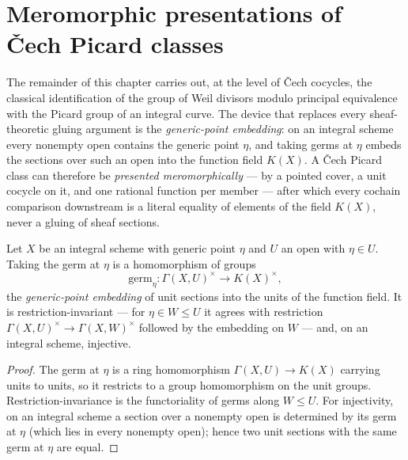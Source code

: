 \section{Meromorphic presentations of \v Cech Picard classes}

The remainder of this chapter carries out, at the level of \v Cech cocycles, the classical
identification of the group of Weil divisors modulo principal equivalence with the Picard group
of an integral curve. The device that replaces every sheaf-theoretic gluing argument is the
\emph{generic-point embedding}: on an integral scheme every nonempty open contains the generic
point \(\eta\), and taking germs at \(\eta\) embeds the sections over such an open into the
function field \(K(X)\). A \v Cech Picard class can therefore be \emph{presented meromorphically}
--- by a pointed cover, a unit cocycle on it, and one rational function per member --- after
which every cochain comparison downstream is a literal equality of elements of the field
\(K(X)\), never a gluing of sheaf sections.

\begin{definition}
  \label{def:germGenericUnits}
  \leanok
  Let \(X\) be an integral scheme with generic point \(\eta\) and \(U\) an open with
  \(\eta \in U\). Taking the germ at \(\eta\) is a homomorphism of groups
  \[
    \mathrm{germ}_\eta \colon \Gamma(X,U)^{\times} \longrightarrow K(X)^{\times},
  \]
  the \emph{generic-point embedding} of unit sections into the units of the function field. It is
  restriction-invariant --- for \(\eta \in W \le U\) it agrees with restriction
  \(\Gamma(X,U)^{\times} \to \Gamma(X,W)^{\times}\) followed by the embedding on \(W\) --- and, on
  an integral scheme, injective.
\end{definition}
\begin{proof}
  \leanok
  The germ at \(\eta\) is a ring homomorphism \(\Gamma(X,U) \to K(X)\) carrying units to units, so
  it restricts to a group homomorphism on the unit groups. Restriction-invariance is the
  functoriality of germs along \(W \le U\). For injectivity, on an integral scheme a section over
  a nonempty open is determined by its germ at \(\eta\) (which lies in every nonempty open); hence
  two unit sections with the same germ at \(\eta\) are equal.
\end{proof}

